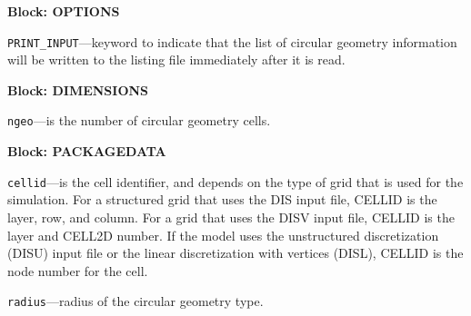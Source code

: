 
\item \textbf{Block: OPTIONS}

\begin{description}
\item \texttt{PRINT\_INPUT}---keyword to indicate that the list of circular geometry information will be written to the listing file immediately after it is read.

\end{description}
\item \textbf{Block: DIMENSIONS}

\begin{description}
\item \texttt{ngeo}---is the number of circular geometry cells.

\end{description}
\item \textbf{Block: PACKAGEDATA}

\begin{description}
\item \texttt{cellid}---is the cell identifier, and depends on the type of grid that is used for the simulation.  For a structured grid that uses the DIS input file, CELLID is the layer, row, and column.   For a grid that uses the DISV input file, CELLID is the layer and CELL2D number.  If the model uses the unstructured discretization (DISU) input file or the linear discretization with vertices (DISL), CELLID is the node number for the cell.

\item \texttt{radius}---radius of the circular geometry type.

\end{description}

